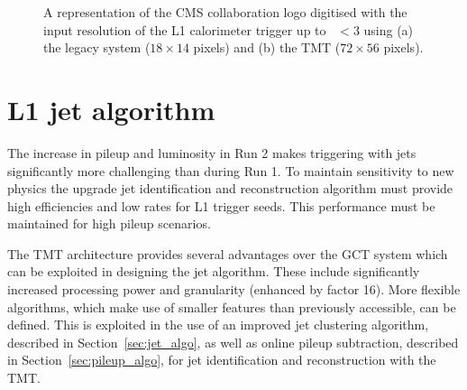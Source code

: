 \begin{figure}
\centering
{} \quad
{} 
\caption{A representation of the CMS collaboration logo digitised with the input resolution of the L1 calorimeter trigger up to 
\etaabs~$< 3$ using (a) the legacy system ($18 \times 14$ pixels) and (b) the TMT ($72 \times 56$ pixels).}
\label{fig:inputres}
\end{figure}

\section{L1 jet algorithm}
\label{algo}

The increase in pileup and luminosity in Run 2 makes triggering with jets
significantly more challenging than during Run 1. To maintain sensitivity to
new physics the upgrade jet identification and reconstruction 
algorithm must provide high efficiencies and low rates for L1 trigger seeds.
This performance must be maintained for high pileup scenarios.

The TMT architecture provides several advantages over the GCT system which can be 
exploited in designing the jet algorithm. These include significantly increased processing power
and granularity (enhanced by factor 16). More flexible algorithms, which 
make use of smaller features than previously accessible, can be defined. This is exploited in the 
use of an improved jet clustering algorithm, described in Section~\ref{sec:jet_algo}, as well as 
online pileup subtraction, described in Section~\ref{sec:pileup_algo}, for jet 
identification and reconstruction with the TMT.

